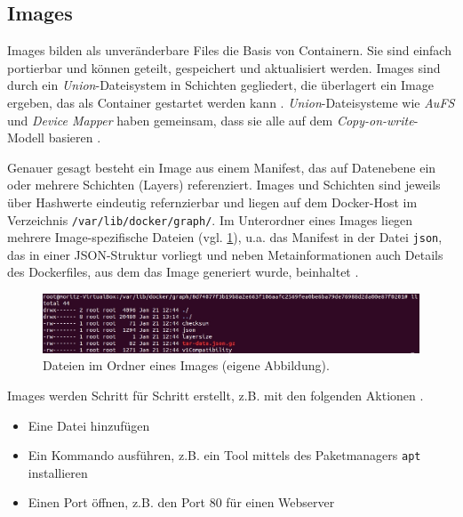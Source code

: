 \documentclass[../main.tex]{subfiles}
\begin{document}
		\subsection{Images}
    \label{dockerImages}
			Images bilden als unveränderbare Files die Basis von Containern. Sie sind einfach portierbar und können geteilt, gespeichert und aktualisiert werden. Images sind durch ein \emph{Union}-Dateisystem in Schichten gegliedert, die überlagert ein Image ergeben, das als Container gestartet werden kann \cite[S.11]{dockerBook}. \emph{Union}-Dateisysteme wie \emph{AuFS} und \emph{Device Mapper} haben gemeinsam, dass sie alle auf dem \emph{Copy-on-write}-Modell basieren \cite[S.8]{dockerBook}\cite[S.3]{dockerIntroIEEE}\cite[S.4]{dockerSecIntro}.

			Genauer gesagt besteht ein Image aus einem Manifest, das auf Datenebene ein oder mehrere Schichten (Layers) referenziert. Images und Schichten sind jeweils über Hashwerte eindeutig refernzierbar und liegen auf dem Docker-Host im Verzeichnis \texttt{/var/lib/docker/graph/}. Im Unterordner eines Images liegen mehrere Image-spezifische Dateien (vgl. \fig \ref{fig:intro_dockerImageVZ}), u.a. das Manifest in der Datei \texttt{json}, das in einer \acrshort{JSON}-Struktur vorliegt und neben Metainformationen auch Details des Dockerfiles, aus dem das Image generiert wurde, beinhaltet \cite{githubDockerGlossary}.

			\begin{figure}[!htbp]
          \centering
          \includegraphics[width=1.0\textwidth]{./images/intro_dockerImageVZ.jpg}
          \caption{Dateien im Ordner eines Images (eigene Abbildung).}
          \label{fig:intro_dockerImageVZ}
      \end{figure}

			Images werden Schritt für Schritt erstellt, z.B. mit den folgenden Aktionen \cite[S.11]{dockerBook}.
			\begin{itemize}
				\item Eine Datei hinzufügen
				\item Ein Kommando ausführen, z.B. ein Tool mittels des Paketmanagers \texttt{apt} installieren
				\item Einen Port öffnen, z.B. den Port 80 für einen Webserver
			\end{itemize}
\end{document}
